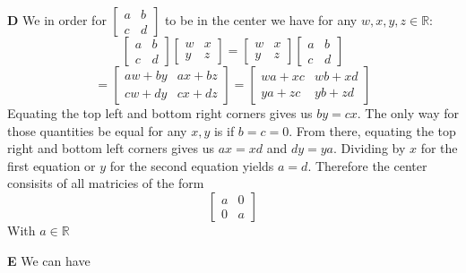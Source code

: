 \documentclass[12pt]{article}
\newenvironment{ques}{\vspace{2 ex}}{\vspace{2 ex}}
\theoremstyle{definition}
\begin{document}
\begin{ques}
	\textbf{D}
	We in order for $\left[\begin{array}{cc} a & b \\ c & d
	\end{array}\right]$ to be in the center we have for any $w,x,y,z
	\in \mathbb R$:
	$$\left[\begin{array}{cc} a & b \\ c &
	d \end{array}\right]\left[\begin{array}{cc} w &
	x \\ y & z \end{array}\right] =
	\left[\begin{array}{cc} w & x \\ y & z
	\end{array}\right]\left[\begin{array}{cc}
	a & b \\ c & d \end{array}\right]$$
	$$= \left[\begin{array}{cc} aw + by & ax + bz
	\\ cw + dy & cx + dz \end{array}\right] =
	\left[\begin{array}{cc} wa + xc & wb + xd
	\\ ya + zc & yb + zd \end{array}\right] $$
	Equating the top left and bottom right corners gives us $by =
	cx$. The only way for those quantities be equal for any $x,y$ is if
	$b= c= 0$. From there, equating the top right and bottom left
	corners gives us $ax = xd$ and $dy = ya$. Dividing by $x$ for
	the first equation or $y$ for the second equation yields $a =
	d$. Therefore the center consisits of all matricies of the form
	$$\left[ \begin{array}{cc} a & 0 \\ 0 & a \end{array} \right]$$
	With $a \in \mathbb R$
\end{ques}

\begin{ques}
	\textbf{E}
	We can have 
\end{ques}
\end{document}
